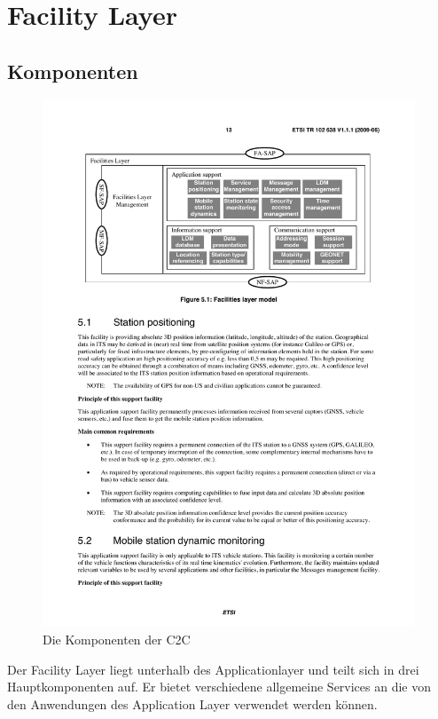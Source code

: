 \chapter{Facility Layer \label{chap:facilitylayer}}
\section{Komponenten}
\begin{figure}[htbp]
\includegraphics[width=0.99\textwidth]{content/images/04_facilitylayer/facility_layer_model.pdf}
\caption{Die Komponenten der \acl{C2C}}
\label{fig:komponentenfacility}
\end{figure}
Der Facility Layer liegt unterhalb des Applicationlayer und teilt sich in drei Hauptkomponenten auf. Er bietet verschiedene allgemeine Services an die von den Anwendungen des Application Layer verwendet werden können.


